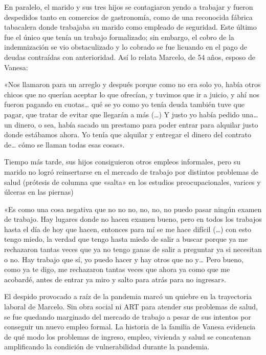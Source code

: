 \begin{refsection}
\begin{gbcita}
\end{gbcita}

En paralelo, el marido y sus tres hijos se contagiaron yendo a trabajar y fueron despedidos tanto en comercios de gastronomía, como de una reconocida fábrica tabacalera donde trabajaba su marido como empleado de seguridad. Este último fue el único que tenía un trabajo formalizado; sin embargo, el cobro de la indemnización se vio obstaculizado y lo cobrado se fue licuando en el pago de deudas contraídas con anterioridad. Así lo relata Marcelo, de 54 años, esposo de Vanesa:


\begin{gbcita}
«Nos llamaron para un arreglo y después porque como no era solo yo, había otros chicos que no querían aceptar lo que ofrecían, y tuvimos que ir a juicio, y ahí nos fueron pagando en cuotas… qué se yo como yo tenía deuda también tuve que pagar, que tratar de evitar que llegarán a más (…) Y justo yo había pedido una… un dinero, o sea, había sacado un prestamo para poder entrar para alquilar justo donde estábamos ahora. Yo tenía que alquilar y entregar el dinero del contrato de… cómo se llaman todas esas cosas».

\end{gbcita}

Tiempo más tarde, sus hijos consiguieron otros empleos informales, pero su marido no logró reinsertarse en el mercado de trabajo por distintos problemas de salud (prótesis de columna que «salta» en los estudios preocupacionales, varices y úlceras en las piernas)


\begin{gbcita}
«Es como una cosa negativa que no no no, no, no, no puedo pasar ningún examen de trabajo. Hay lugares donde no hacen examen bueno, pero en todos los trabajos hasta el día de hoy que hacen, entonces para mí se me hace difícil (…) con esto tengo miedo, la verdad que tengo hasta miedo de salir a buscar porque ya me rechazaron tantas veces que ya no tengo ganas de salir a preguntar ya si necesitan o no. Hay trabajo que sí, yo puedo hacer y hay otros que no y… Pero bueno, como ya te digo, me rechazaron tantas veces que ahora ya como que me acobardé, antes de entrar ya miro y salto para atrás para no ingresar».

\end{gbcita}

El despido provocado a raíz de la pandemia marcó un quiebre en la trayectoria laboral de Marcelo. Sin obra social ni ART para atender sus problemas de salud, se fue quedando marginado del mercado de trabajo a pesar de sus intentos por conseguir un nuevo empleo formal. La historia de la familia de Vanesa evidencia de qué modo los problemas de ingreso, empleo, vivienda y salud se concatenan amplificando la condición de vulnerabilidad durante la pandemia.



\end{refsection}
